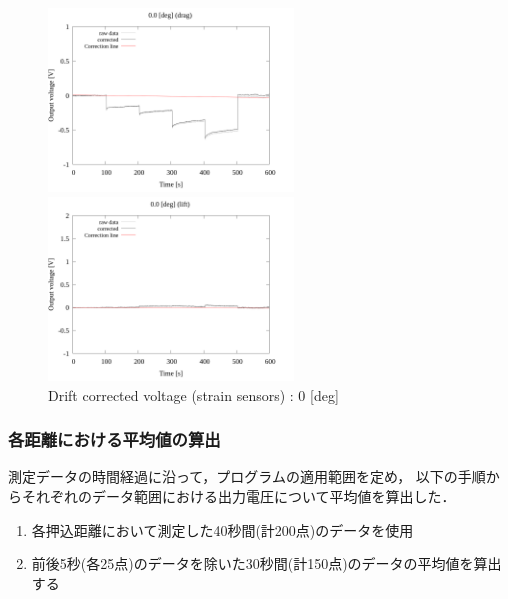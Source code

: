 \begin{figure}[htbp]
  \begin{minipage}[b]{0.45\linewidth}
    \centering
    \includegraphics[width=65mm]{../../02_workspace/result/2-1/plot/02-2_drag/02_drag-drift_0.png}
  \end{minipage}
  \begin{minipage}[b]{0.45\linewidth}
    \centering
    \includegraphics[width=65mm]{../../02_workspace/result/2-1/plot/02-3_lift/02_lift-drift_0.png}
  \end{minipage}
  \caption{Drift corrected voltage (strain sensors) : 0 [deg]}
\end{figure}

\newpage

\subsubsection{各距離における平均値の算出}

測定データの時間経過に沿って，プログラムの適用範囲を定め，
以下の手順からそれぞれのデータ範囲における出力電圧について平均値を算出した．

\begin{enumerate}[(1)]
  \item 各押込距離において測定した40秒間(計200点)のデータを使用
  \item 前後5秒(各25点)のデータを除いた30秒間(計150点)のデータの平均値を算出する
\end{enumerate}

